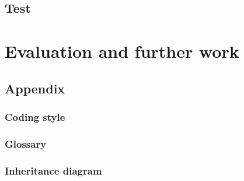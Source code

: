 \documentclass[a4paper,11pt,fleqn,twoside,openright]{memoir} 	%
\begin{document}
\chapter{Test}
%

\part{Evaluation and further work}
%

\chapter{Appendix}
\section{Coding style}
%
\section{Glossary}
\label{glossary}
\section{Inheritance diagram}

\begingroup
 \raggedright
 
\endgroup

\appendix
\clearforchapter

\end{document}
